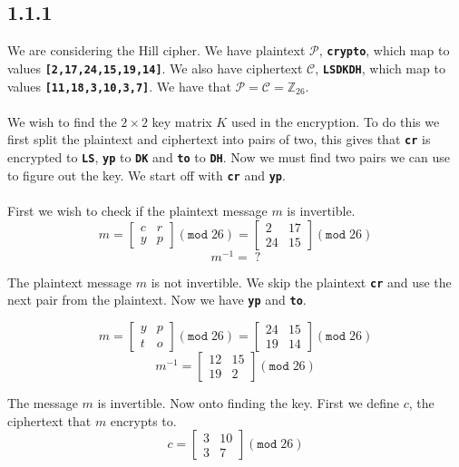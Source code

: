 \documentclass[11pt]{report}
\begin{document}
\subsection*{1.1.1}
We are considering the Hill cipher. We have plaintext $\mathcal{P}$, {\tt\bfseries crypto}, which map to values {\tt\bfseries [2,17,24,15,19,14]}. We also have ciphertext $\mathcal{C}$, {\tt\bfseries LSDKDH}, which map to values {\tt\bfseries [11,18,3,10,3,7]}. We have that $\mathcal{P} = \mathcal{C} = \mathbb{Z}_{26}$.
\\
\\
We wish to find the $2 \times 2$ key matrix $K$ used in the encryption. To do this we first split the plaintext and ciphertext into pairs of two, this gives that {\tt\bfseries cr} is encrypted to {\tt\bfseries LS}, {\tt\bfseries yp} to {\tt\bfseries DK} and {\tt\bfseries to} to {\tt\bfseries DH}. Now we must find two pairs we can use to figure out the key. We start off with {\tt\bfseries cr} and {\tt\bfseries yp}.\\
\\
First we wish to check if the plaintext message $m$ is invertible.
$$m = \begin{bmatrix}
       c & r\\
       y & p
	\end{bmatrix} (\mathtt{mod}\;26) = \begin{bmatrix}
       2 & 17\\
       24 & 15
	\end{bmatrix} (\mathtt{mod}\;26)$$
$$m^{-1} =\;?$$

The plaintext message $m$ is not invertible. We skip the plaintext {\tt\bfseries cr} and use the next pair from the plaintext. Now we have {\tt\bfseries yp} and {\tt\bfseries to}.

$$m = \begin{bmatrix}
       	y & p\\
     	t & o
	\end{bmatrix} (\mathtt{mod}\;26) = \begin{bmatrix}
		24 & 15\\
		19 & 14
	\end{bmatrix} (\mathtt{mod}\;26)$$
$$m^{-1} = \begin{bmatrix}
		12 & 15\\
		19 & 2
	\end{bmatrix} (\mathtt{mod}\;26)$$

The message $m$ is invertible. Now onto finding the key. First we define $c$, the ciphertext that $m$ encrypts to.
$$c = \begin{bmatrix}
		3 & 10\\
		3 & 7
	\end{bmatrix} (\mathtt{mod}\;26)$$
	
\end{document}
